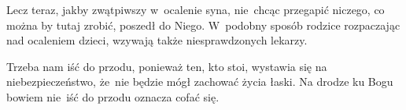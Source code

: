 \documentclass[a4paper,11pt]{article}
\newcommand{\attribA}[1]{#1}
\begin{document}

\vspace{\spaceThree}



\noindent
Lecz teraz, jakby zwątpiwszy w~ocalenie syna, nie~chcąc przegapić
niczego, co można by tutaj zrobić, poszedł do Niego. W~podobny sposób
rodzice rozpaczając nad ocaleniem dzieci, wzywają także
niesprawdzonych lekarzy.


\vspace{\spaceThree}



\noindent
Trzeba nam iść do przodu, ponieważ ten, kto stoi, wystawia się na
niebezpieczeństwo, że~nie będzie mógł zachować życia łaski. Na drodze
ku Bogu bowiem nie~iść do przodu oznacza cofać się.








\end{document}
